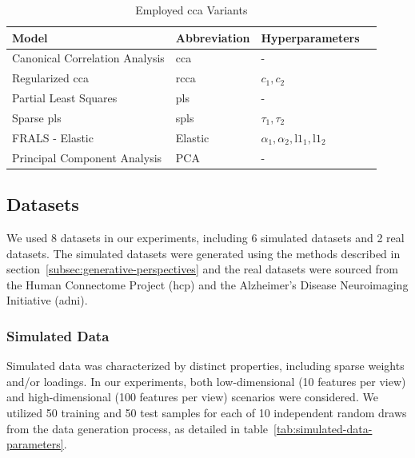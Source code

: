 \begin{table}[h]
\centering
\caption{Employed \acrshort{cca} Variants}
\begin{tabular}{|l|l|l|l|}
\hline
\textbf{Model} & \textbf{Abbreviation} & \textbf{Hyperparameters}  \\
\hline
Canonical Correlation Analysis & \acrshort{cca} & -   \\
\hline
Regularized \acrshort{cca} & \acrshort{rcca} & \(c_1, c_2\)   \\
\hline
Partial Least Squares & \acrshort{pls} & -   \\
\hline
Sparse \acrshort{pls} & \acrshort{spls} & \(\tau_1, \tau_2\)   \\
\hline
FRALS - Elastic & Elastic & \(\alpha_1, \alpha_2, \text{l1}_1, \text{l1}_2\)   \\
\hline
Principal Component Analysis & PCA & -  \\
\hline
\end{tabular}
\end{table}

\subsection{Datasets}

We used 8 datasets in our experiments, including 6 simulated datasets and 2 real datasets.
The simulated datasets were generated using the methods described in section~\ref{subsec:generative-perspectives} and the real datasets were sourced from the Human Connectome Project (\acrshort{hcp}) and the Alzheimer's Disease Neuroimaging Initiative (\acrshort{adni}).

\subsubsection{Simulated Data}

Simulated data was characterized by distinct properties, including sparse weights and/or loadings.
In our experiments, both low-dimensional (10 features per view) and high-dimensional (100 features per view) scenarios were considered.
We utilized 50 training and 50 test samples for each of 10 independent random draws from the data generation process, as detailed in table~\ref{tab:simulated-data-parameters}.

